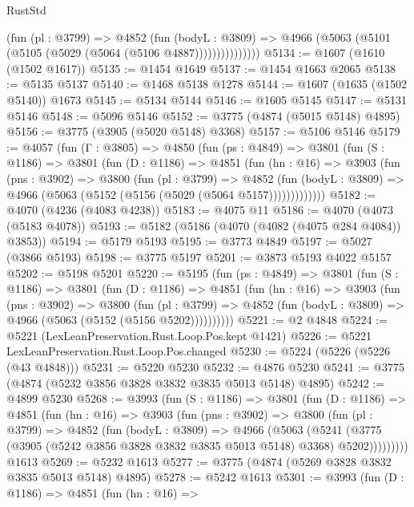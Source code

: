 \begin{lexlean}{RustStd}
\begin{coremodule}
{\begin{coremodule}
{{{{{{{{{{{{{{{{{{{{{{{{{{{{{{{                  (fun (pl : @3799) =>
                  @4852
                    (fun (bodyL : @3809) =>
                    @4966 (@5063 (@5101 (@5105 (@5029 (@5064 (@5106 @4887)))))))))))))))
@5134 := @1607 (@1610 (@1502 @1617))
@5135 := @1454 @1649
@5137 := @1454 @1663 @2065
@5138 := @5135 @5137
@5140 := @1468 @5138 @1278
@5144 := @1607 (@1635 (@1502 @5140)) @1673
@5145 := @5134 @5144
@5146 := @1605 @5145
@5147 := @5131 @5146
@5148 := @5096 @5146
@5152 := @3775 (@4874 (@5015 @5148) @4895)
@5156 := @3775 (@3905 (@5020 @5148) @3368)
@5157 := @5106 @5146
@5179 := @4057
    (fun (Γ : @3805) =>
    @4850
      (fun (ps : @4849) =>
      @3801
        (fun (S : @1186) =>
        @3801
          (fun (D : @1186) =>
          @4851
            (fun (hn : @16) =>
            @3903
              (fun (pns : @3902) =>
              @3800
                (fun (pl : @3799) =>
                @4852
                  (fun (bodyL : @3809) =>
                  @4966 (@5063 (@5152 (@5156 (@5029 (@5064 @5157)))))))))))))
@5182 := @4070 (@4236 (@4083 @4238))
@5183 := @4075 @11
@5186 := @4070 (@4073 (@5183 @4078))
@5193 := @5182 (@5186 (@4070 (@4082 (@4075 @284 @4084)) @3853))
@5194 := @5179 @5193
@5195 := @3773 @4849
@5197 := @5027 (@3866 @5193)
@5198 := @3775 @5197
@5201 := @3873 @5193 @4022 @5157
@5202 := @5198 @5201
@5220 := @5195
    (fun (ps : @4849) =>
    @3801
      (fun (S : @1186) =>
      @3801
        (fun (D : @1186) =>
        @4851
          (fun (hn : @16) =>
          @3903
            (fun (pns : @3902) =>
            @3800
              (fun (pl : @3799) =>
              @4852 (fun (bodyL : @3809) => @4966 (@5063 (@5152 (@5156 @5202))))))))))
@5221 := @2 @4848
@5224 := @5221 (LexLeanPreservation.Rust.Loop.Pos.kept @1421)
@5226 := @5221 LexLeanPreservation.Rust.Loop.Pos.changed
@5230 := @5224 (@5226 (@5226 (@43 @4848)))
@5231 := @5220 @5230
@5232 := @4876 @5230
@5241 := @3775 (@4874 (@5232 @3856 @3828 @3832 @3835 @5013 @5148) @4895)
@5242 := @4899 @5230
@5268 := @3993
    (fun (S : @1186) =>
    @3801
      (fun (D : @1186) =>
      @4851
        (fun (hn : @16) =>
        @3903
          (fun (pns : @3902) =>
          @3800
            (fun (pl : @3799) =>
            @4852
              (fun (bodyL : @3809) =>
              @4966
                (@5063
                  (@5241
                    (@3775 (@3905 (@5242 @3856 @3828 @3832 @3835 @5013 @5148) @3368) @5202)))))))))
    @1613
@5269 := @5232 @1613
@5277 := @3775 (@4874 (@5269 @3828 @3832 @3835 @5013 @5148) @4895)
@5278 := @5242 @1613
@5301 := @3993
    (fun (D : @1186) =>
    @4851
      (fun (hn : @16) =>
}}}}}}}}}}}}}}}}}}}}}}}}}}}}}}}
\end{coremodule}}
\end{coremodule}
\end{lexlean}
